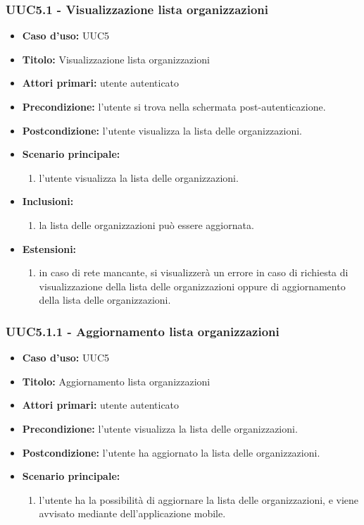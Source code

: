 \documentclass[casi-duso]{subfiles}
\begin{document}
\subsubsection{UUC5.1 - Visualizzazione lista organizzazioni}
\label{subsub:UUC5utente}
\begin{itemize}
  \item \textbf{Caso d’uso:} UUC5 
  \item \textbf{Titolo:} Visualizzazione lista organizzazioni
  \item \textbf{Attori primari:} utente autenticato
  \item \textbf{Precondizione:} l'utente si trova nella schermata post-autenticazione.
  \item \textbf{Postcondizione:} l'utente visualizza la lista delle organizzazioni.
  \item \textbf{Scenario principale:} 
  \begin{enumerate}
    \item l'utente visualizza la lista delle organizzazioni.
  \end{enumerate}  
  \item \textbf{Inclusioni:} 
  \begin{enumerate}
    \item la lista delle organizzazioni può essere aggiornata.
  \end{enumerate}
  \item \textbf{Estensioni:} 
  \begin{enumerate}
    \item in caso di rete mancante, si visualizzerà un errore in caso di richiesta di visualizzazione della lista delle organizzazioni
    oppure di aggiornamento della lista delle organizzazioni.
  \end{enumerate}  
\end{itemize}

\subsubsection{UUC5.1.1 - Aggiornamento lista organizzazioni}
\label{subsub:UUC5utente}
\begin{itemize}
  \item \textbf{Caso d’uso:} UUC5 
  \item \textbf{Titolo:} Aggiornamento lista organizzazioni
  \item \textbf{Attori primari:} utente autenticato
  \item \textbf{Precondizione:} l'utente visualizza la lista delle organizzazioni.
  \item \textbf{Postcondizione:} l'utente ha aggiornato la lista delle organizzazioni.
  \item \textbf{Scenario principale:} 
  \begin{enumerate}
    \item l'utente ha la possibilità di aggiornare la lista delle organizzazioni, e viene avvisato mediante  
    dell'applicazione mobile.
  \end{enumerate}  
\end{itemize}
\end{document}
